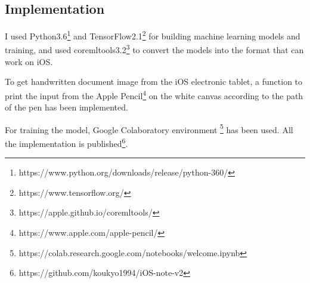 \subsection{Implementation}

I used Python3.6\footnote{https://www.python.org/downloads/release/python-360/} and
TensorFlow2.1\footnote{https://www.tensorflow.org/} for building machine learning
models and training, and used coremltools3.2\footnote{https://apple.github.io/coremltools/}
to convert the models into the format that can work on iOS.

To get handwritten document image from the iOS electronic tablet, a function to print
the input from the Apple Pencil\footnote{https://www.apple.com/apple-pencil/} on the white canvas
according to the path of the pen has been implemented.

For training the model, Google Colaboratory environment
\footnote{https://colab.research.google.com/notebooks/welcome.ipynb} has been used.
All the implementation is published\footnote{https://github.com/koukyo1994/iOS-note-v2}.
